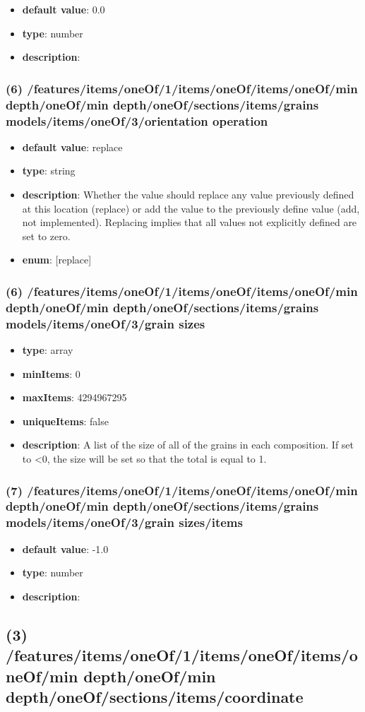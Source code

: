 \begin{itemize}[leftmargin=8em]\item {\bf default value}: 0.0
\item {\bf type}: number
\item {\bf description}: 
\end{itemize}\subsubsection{(6) /features/items/oneOf/1/items/oneOf/items/oneOf/min depth/oneOf/min depth/oneOf/sections/items/grains models/items/oneOf/3/orientation operation}
\begin{itemize}[leftmargin=6em]\item {\bf default value}: replace
\item {\bf type}: string
\item {\bf description}: Whether the value should replace any value previously defined at this location (replace) or add the value to the previously define value (add, not implemented). Replacing implies that all values not explicitly defined are set to zero.
\item {\bf enum}: [replace]\end{itemize}\subsubsection{(6) /features/items/oneOf/1/items/oneOf/items/oneOf/min depth/oneOf/min depth/oneOf/sections/items/grains models/items/oneOf/3/grain sizes}
\begin{itemize}[leftmargin=6em]\item {\bf type}: array
\item {\bf minItems}: 0
\item {\bf maxItems}: 4294967295
\item {\bf uniqueItems}: false
\item {\bf description}: A list of the size of all of the grains in each composition. If set to <0, the size will be set so that the total is equal to 1.
\end{itemize}\subsubsection{(7) /features/items/oneOf/1/items/oneOf/items/oneOf/min depth/oneOf/min depth/oneOf/sections/items/grains models/items/oneOf/3/grain sizes/items}
\begin{itemize}[leftmargin=7em]\item {\bf default value}: -1.0
\item {\bf type}: number
\item {\bf description}: 
\end{itemize}\subsection{(3) /features/items/oneOf/1/items/oneOf/items/oneOf/min depth/oneOf/min depth/oneOf/sections/items/coordinate}
